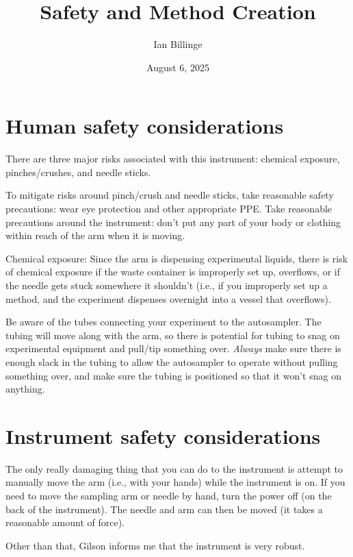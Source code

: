 \documentclass[11pt, oneside]{article}   	%
\title{Safety and Method Creation}
\author{Ian Billinge}
\date{August 6, 2025}							%
\begin{document}
\maketitle


\section*{Human safety considerations}
There are three major risks associated with this instrument: chemical exposure, pinches/crushes, and needle sticks.

To mitigate risks around pinch/crush and needle sticks, take reasonable safety precautions: wear eye protection and other appropriate PPE. Take reasonable precautions around the instrument: don't put any part of your body or clothing within reach of the arm when it is moving.

Chemical exposure: Since the arm is dispensing experimental liquids, there is risk of chemical exposure if the waste container is improperly set up, overflows, or if the needle gets stuck somewhere it shouldn't (i.e., if you improperly set up a method, and the experiment dispenses overnight into a vessel that overflows).

Be aware of the tubes connecting your experiment to the autosampler. The tubing will move along with the arm, so there is potential for tubing to snag on experimental equipment and pull/tip something over. \emph{Always} make sure there is enough slack in the tubing to allow the autosampler to operate without pulling something over, and make sure the tubing is positioned so that it won't snag on anything.

\section*{Instrument safety considerations}
The only really damaging thing that you can do to the instrument is attempt to manually move the arm (i.e., with your hands) while the instrument is on. If you need to move the sampling arm or needle by hand, turn the power off (on the back of the instrument). The needle and arm can then be moved (it takes a reasonable amount of force).

Other than that, Gilson informs me that the instrument is very robust.
\end{document}
